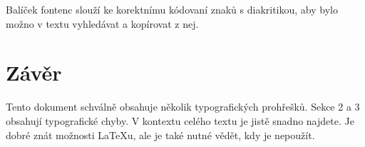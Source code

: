 \documentclass[a4paper,twocolumn,10pt]{article}
\begin{document}
Balíček \textsf{fontenc} slouží ke korektnímu kódovaní znaků s diakritikou, aby bylo možno v textu vyhledávat a kopírovat z nej.

\section{Závěr}

Tento dokument schválně obsahuje několik typografických prohřešků. Sekce 2 a 3 obsahují typografické chyby. V kontextu celého textu je jistě snadno najdete. Je dobré znát možnosti \LaTeX u, ale je také nutné vědět, kdy je nepoužít.
\end{document}
